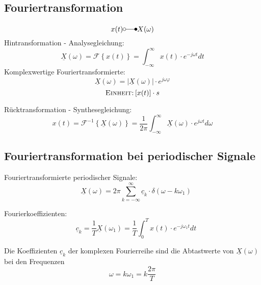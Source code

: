 \subsection{Fouriertransformation}
\begin{mdframed}[style=exercise]
    \[
        x(t) \laplace X(\omega)
    \]
    Hintransformation - Analysegleichung:
    \[
        \underline{X}(\omega)=\mathcal{F}\left\{ x(t) \right\} = \int_{-\infty}^{\infty} x(t) \cdot e^{-j\omega t} dt
    \]
    Komplexwertige Fouriertransformierte:
    \[
        \underline{X}(\omega) = |\underline{X}(\omega)|\cdot e^{j\omega\varphi}
    \]
    \footnotesize
    $$\textsc{Einheit:} \left[ x(t) \right]\cdot s$$

    \normalsize

    Rücktransformation - Synthesegleichung:
    \[
        x(t) = \mathcal{F}^{-1}\left\{ \underline{X}(\omega) \right\} = \frac{1}{2\pi}\int_{-\infty}^{\infty} \underline{X}(\omega) \cdot e^{j\omega t} d\omega
    \]
\end{mdframed}

\subsection{Fouriertransformation bei periodischer Signale}
\begin{mdframed}[style=exercise]

Fouriertransformierte periodischer Signale:
\[
    \quad \underline{X}(\omega) =
    2\pi\sum_{k=-\infty}^{\infty} \underline{c}_k\cdot
    \delta(\omega-k\omega_1)
\]

Fourierkoeffizienten:
\[
    \quad \underline{c}_k =
    \frac{1}{T}\underline{X}(\omega_1) =
    \frac{1}{T}\int_0^T x(t) \cdot e^{-j\omega_1 t} dt
\]

Die Koeffizienten $\underline{c}_k $ der komplexen Fourierreihe sind die
Abtastwerte von $\underline{X}(\omega)$ bei den Frequenzen
\[\omega=k\omega_1=k\frac{2\pi}{T}\]
\end{mdframed}

